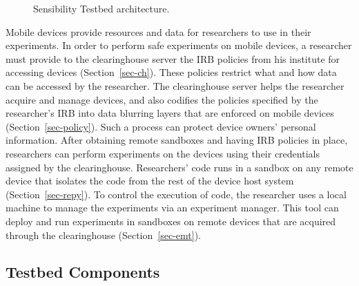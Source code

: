 \begin{figure}
\caption{\small Sensibility Testbed architecture. \label{fig-arch}}
\end{figure}

Mobile devices
provide resources and data for researchers to use in their
experiments. In order to perform safe experiments on mobile
devices, a researcher must provide to the clearinghouse server
the IRB policies from his institute for accessing devices 
(Section~\ref{sec-ch}).  These 
policies restrict what and how data can be accessed by the 
researcher. The
clearinghouse server helps the researcher acquire and manage
devices, and also codifies the policies specified by the
researcher's IRB into data blurring layers that are enforced on
mobile devices (Section~\ref{sec-policy}). Such a process can protect device
owners' personal information. After obtaining remote sandboxes
and having IRB policies in place, researchers can perform
experiments on the devices using their credentials assigned by
the clearinghouse. Researchers' code runs in a sandbox on any
remote device that isolates the code from the rest of the device
host system (Section~\ref{sec-repy}). To control the execution of 
code, the researcher uses a local machine to manage the 
experiments via an experiment manager. This tool can deploy 
and run experiments in sandboxes on remote devices that are 
acquired through the clearinghouse (Section~\ref{sec-emt}).



\subsection{Testbed Components}\label{sec-component}

